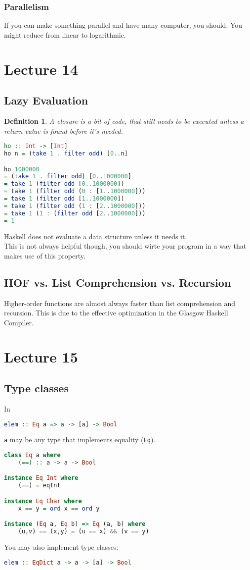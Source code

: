 \documentclass{article}
\newtheorem{definition}{Definition}
\begin{document}
\subsubsection{Parallelism}
If you can make something parallel and have many computer, you should. You might reduce from linear to logarithmic.
\section{Lecture 14}
\subsection{Lazy Evaluation}
\begin{definition}
    A closure is a bit of code, that still needs to be executed unless a return value is found before it's needed.
\end{definition}
\begin{lstlisting}[language=haskell]
ho :: Int -> [Int]
ho n = (take 1 . filter odd) [0..n]

ho 1000000
= (take 1 . filter odd) [0..1000000]
= take 1 (filter odd [0..1000000])
= take 1 (filter odd (0 : [1..1000000]))
= take 1 (filter odd [1..1000000])
= take 1 (filter odd (1 : [2..1000000]))
= take 1 (1 : (filter odd [2..1000000]))
= 1
\end{lstlisting}
Haskell does not evaluate a data structure unless it needs it.\\
This is not always helpful though, you should wirte your program in a way that makes use of this property.
\subsection{HOF vs. List Comprehension vs. Recursion}
Higher-order functions are almost always faster than list comprehension and recursion. This is due to the effective optimization in the Glasgow Haskell Compiler.
\section{Lecture 15}
\subsection{Type classes}
In
\begin{lstlisting}[language=haskell]
elem :: Eq a => a -> [a] -> Bool
\end{lstlisting}
\texttt{a} may be any type that implements equality (\texttt{Eq}).\\
\begin{lstlisting}[language=haskell]
class Eq a where
    (==) :: a -> a -> Bool

instance Eq Int where
    (==) = eqInt

instance Eq Char where
    x == y = ord x == ord y

instance (Eq a, Eq b) => Eq (a, b) where
    (u,v) == (x,y) = (u == x) && (v == y)
\end{lstlisting}
You may also implement type classes:
\begin{lstlisting}[language=haskell]
elem :: EqDict a -> a -> [a] -> Bool
\end{lstlisting}
\end{document}
